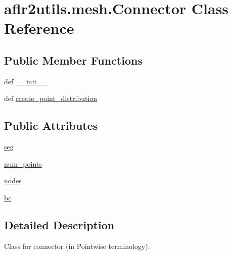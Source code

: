 \hypertarget{classaflr2utils_1_1mesh_1_1Connector}{\section{aflr2utils.\-mesh.\-Connector Class Reference}
\label{classaflr2utils_1_1mesh_1_1Connector}
}
\subsection*{Public Member Functions}
\begin{DoxyCompactItemize}
\item 
def \hyperlink{classaflr2utils_1_1mesh_1_1Connector_a1f1d885ff7aa4c554fd9de26d62df2ab}{\-\_\-\-\_\-init\-\_\-\-\_\-}
\item 
def \hyperlink{classaflr2utils_1_1mesh_1_1Connector_a2e326dbcde99f1d99492dae842d439ba}{create\-\_\-point\-\_\-distribution}
\end{DoxyCompactItemize}
\subsection*{Public Attributes}
\begin{DoxyCompactItemize}
\item 
\hyperlink{classaflr2utils_1_1mesh_1_1Connector_aeaa7d5ba24f17928e1c0c60cc2b92f70}{seg}
\item 
\hyperlink{classaflr2utils_1_1mesh_1_1Connector_a1c20205fb5946a6b3d5e9c2cf86f9173}{num\-\_\-points}
\item 
\hyperlink{classaflr2utils_1_1mesh_1_1Connector_a820425dc41d23724ecab5ce72f336d0b}{nodes}
\item 
\hyperlink{classaflr2utils_1_1mesh_1_1Connector_a59689632fcfb6fc3470d0163b29bd823}{bc}
\end{DoxyCompactItemize}


\subsection{Detailed Description}
\begin{DoxyVerb}Class for connector (in Pointwise terminology).\end{DoxyVerb}
 

